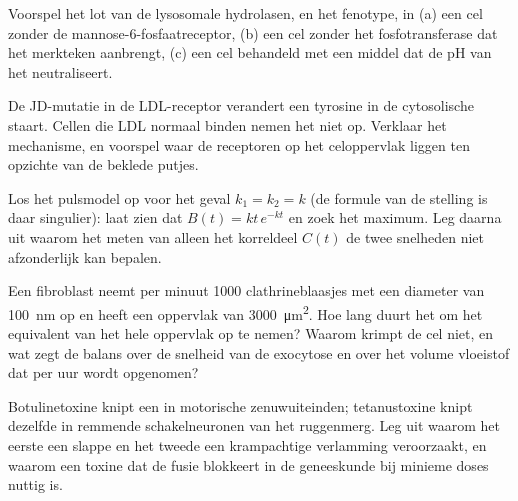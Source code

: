 \begin{exercise}[$\star\star$]\label{exo:b3:membrane-traffic:8}
Voorspel het lot van de lysosomale hydrolasen, en het fenotype, in (a)
een cel zonder de mannose-6-fosfaatreceptor, (b) een cel zonder het
fosfotransferase dat het merkteken aanbrengt, (c) een cel behandeld met
een middel dat de pH van het  neutraliseert.
\end{exercise}

\begin{exercise}[$\star\star$]\label{exo:b3:membrane-traffic:9}
De JD-mutatie in de LDL-receptor verandert een tyrosine in de
cytosolische staart. Cellen die LDL normaal binden nemen het niet op.
Verklaar het mechanisme, en voorspel waar de receptoren op het
celoppervlak liggen ten opzichte van de beklede putjes.
\end{exercise}

\begin{exercise}[$\star\star\star$]\label{exo:b3:membrane-traffic:10}
Los het pulsmodel op voor het geval $k_{1} = k_{2} = k$ (de formule van
de stelling is daar singulier): laat zien dat $B(t) = kt\,e^{-kt}$ en
zoek het maximum. Leg daarna uit waarom het meten van alleen het
korreldeel $C(t)$ de twee snelheden niet afzonderlijk kan bepalen.
\end{exercise}

\begin{exercise}[$\star\star\star$]\label{exo:b3:membrane-traffic:11}
Een fibroblast neemt per minuut \num{1000} clathrineblaasjes met een
diameter van \qty{100}{nm} op en heeft een oppervlak van
\qty{3000}{\micro m^2}. Hoe lang duurt het om het equivalent van het
hele oppervlak op te nemen? Waarom krimpt de cel niet, en wat zegt de
balans over de snelheid van de exocytose en over het volume vloeistof
dat per uur wordt opgenomen?
\end{exercise}

\begin{exercise}[$\star\star\star$]\label{exo:b3:membrane-traffic:12}
Botulinetoxine knipt een  in motorische zenuwuiteinden;
tetanustoxine knipt dezelfde  in remmende schakelneuronen van het
ruggenmerg. Leg uit waarom het eerste een slappe en het tweede een
krampachtige verlamming veroorzaakt, en waarom een toxine dat de fusie
blokkeert in de geneeskunde bij minieme doses nuttig is.
\end{exercise}


